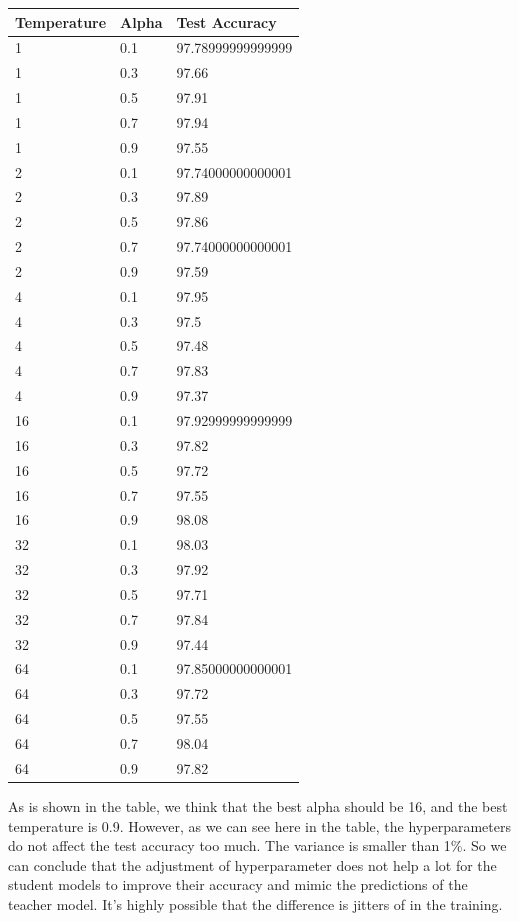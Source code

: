 \documentclass[conference]{IEEEtran}
\begin{document}
\begin{table}[]
    \begin{tabular}{|l|l|l|}
    \hline
    Temperature & Alpha & Test Accuracy      \\ \hline
    1           & 0.1   & 97.78999999999999  \\ \hline
    1           & 0.3   & 97.66 \\ \hline
    1           & 0.5   & 97.91   \\ \hline
    1           & 0.7   & 97.94 \\ \hline
    1           & 0.9   & 97.55  \\ \hline
    2           & 0.1   & 97.74000000000001 \\ \hline
    2           & 0.3   & 97.89 \\ \hline
    2           & 0.5   & 97.86 \\ \hline
    2           & 0.7   & 97.74000000000001  \\ \hline
    2           & 0.9   & 97.59  \\ \hline
    4           & 0.1   & 97.95 \\ \hline
    4           & 0.3   & 97.5 \\ \hline
    4           & 0.5   & 97.48 \\ \hline
    4           & 0.7   & 97.83  \\ \hline
    4           & 0.9   & 97.37 \\ \hline
    16          & 0.1   & 97.92999999999999 \\ \hline
    16          & 0.3   & 97.82 \\ \hline
    16          & 0.5   & 97.72  \\ \hline
    16          & 0.7   & 97.55 \\ \hline
    16          & 0.9   & 98.08  \\ \hline
    32          & 0.1   & 98.03 \\ \hline
    32          & 0.3   & 97.92  \\ \hline
    32          & 0.5   & 97.71 \\ \hline
    32          & 0.7   & 97.84 \\ \hline
    32          & 0.9   & 97.44   \\ \hline
    64          & 0.1   & 97.85000000000001 \\ \hline
    64          & 0.3   & 97.72 \\ \hline
    64          & 0.5   & 97.55 \\ \hline
    64          & 0.7   & 98.04 \\ \hline
    64          & 0.9   & 97.82  \\ \hline
    \end{tabular}
    \end{table}
As is shown in the table, we think that the best alpha should be 16, and the best temperature is 0.9. However, as we can see here in the table, the hyperparameters do not affect the test accuracy too much. The variance is smaller than 1\%. So we can conclude that the adjustment of hyperparameter does not help a lot for the student models to improve their accuracy and mimic the predictions of the teacher model. It's highly possible that the difference is jitters of in the training.
\end{document}
